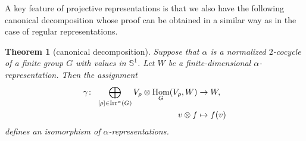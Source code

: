 \documentclass[pdftex]{sigma}
\def\S{\mathbb{S}}
\DeclareMathOperator{\Hom}{\textup{Hom}}
\DeclareMathOperator{\Irr}{\textup{Irr}}
\newtheorem{Th}{Theorem}[section]
\theoremstyle{definition}
\numberwithin{equation}{section}
\begin{document}
A key feature of projective representations is that we also have the following canonical
decomposition whose proof can be obtained in a similar way as in the case of regular
representations.

\begin{Th}[canonical decomposition]\label{can,decom}
Suppose that $\alpha$ is a
normalized $2$-cocycle of a finite group $G$ with values in $\S^{1}$. Let $W$ be a
finite-dimensional $\alpha$-representation. Then the assignment
\begin{align*}
\gamma\colon\ \bigoplus_{[\rho]\in \Irr^{\alpha}(G)}V_{\rho}\otimes \Hom_{G}(V_{\rho},W)
&\rightarrow W,
\\
v\otimes f&\mapsto f(v)
\end{align*}
defines an isomorphism of $\alpha$-representations.
\end{Th}
\end{document}
